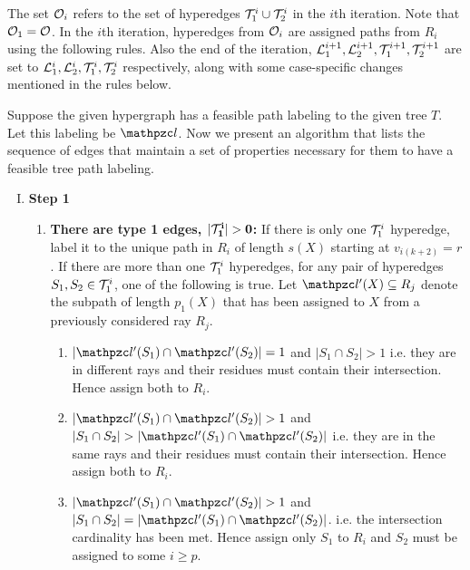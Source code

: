 \documentclass[MS]             %
              {iitmdiss_as}    %
\begin{document}
The set ${\cal O}_i$ refers to the set of hyperedges ${\cal T}_1^i \cup {\cal T}_2^i$ in
the $i$th iteration.  Note that ${\cal O}_1 = {\cal O}$.  In the $i$th
iteration, hyperedges from ${\cal O}_i$ are assigned paths from $R_i$ using
the following rules. Also the end of the iteration, ${\cal L}_1^{i+1}, {\cal L}_2^{i+1}, {\cal T}_1^{i+1},
{\cal T}_2^{i+1}$ are set to ${\cal L}_1^{i}, {\cal L}_2^{i}, {\cal T}_1^{i},
{\cal T}_2^{i}$ respectively, along with some case-specific changes mentioned in the
rules below.

\noindent
Suppose the given hypergraph has a feasible path labeling to the given
tree $T$. Let this labeling be $\cl$. Now we present an algorithm that
lists the sequence of edges that maintain a set of properties
necessary for them to have a feasible tree path labeling.
\begin{enumerate}[I.]
\item {\bf Step 1}
  \begin{enumerate}
  \item {\bf {There are type 1
        edges, $\mathbf{|{\cal T}_1^i| > 0}$}:} 
  {If there is only one ${\cal T}_1^i$ hyperedge, label it to the unique
    path in $R_i$ of length $s(X)$ starting at $v_{i(k+2)}=r$. If
    there are more than one ${\cal T}_1^i$ hyperedges, for any pair of
    hyperedges $S_1, S_2 \in {\cal T}_1^i$, one of the following is
    true. Let $\cl'(X) \subseteq R_j$ denote the subpath of length
    $p_1(X)$ that has been assigned to $X$ from a previously
    considered ray $R_j$.}
  \begin{enumerate}[{\em Case }1. ]
  \item $|\cl'(S_1) \cap \cl'(S_2)| = 1$ and $|S_1 \cap S_2| > 1$
    i.e. they are in different rays and their residues must contain
    their intersection. Hence assign both to $R_i$.
  \item $|\cl'(S_1) \cap \cl'(S_2)| > 1$ and $|S_1 \cap S_2| >
    |\cl'(S_1) \cap \cl'(S_2)|$ i.e. they are in the same rays and
    their residues must contain their intersection. Hence assign both
    to $R_i$.
  \item $|\cl'(S_1) \cap \cl'(S_2)| > 1$ and $|S_1 \cap S_2| =
    |\cl'(S_1) \cap \cl'(S_2)|$. i.e. the intersection cardinality has
    been met. Hence assign only $S_1$ to $R_i$ and $S_2$ must be
    assigned to some $i \ge p$.

\end{enumerate}
\end{enumerate}
\end{enumerate}
\end{document}
